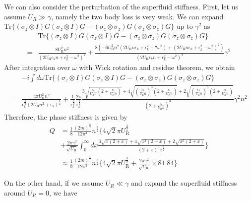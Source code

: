 \documentclass[aps,onecolumn,superscriptaddress,notitlepage,longbibliography]{revtex4-1}
\begin{document}
We can also consider the perturbation of the superfluid stiffness. First, let us assume $U_R\gg\gamma$, namely the two body loss is very weak. We can expand $\mathrm{Tr}\{(\sigma_{z}\otimes I)G(\sigma_{z}\otimes I)G-(\sigma_{z}\otimes\sigma_{z})G(\sigma_{z}\otimes\sigma_{z})G\}$
up to $\gamma^{2}$ as
\begin{align}
 & \mathrm{Tr}\{(\sigma_{z}\otimes I)G(\sigma_{z}\otimes I)G-(\sigma_{z}\otimes\sigma_{z})G(\sigma_{z}\otimes\sigma_{z})G\}\nonumber \\
= & \frac{8U_{\mathrm{R}}^{2}n^{2}}{(2U_{\mathrm{R}}\epsilon_{k}n+\epsilon_{k}^{2}-\omega^{2})^{2}}+\frac{8(-6U_{\mathrm{R}}^{2}n^{2}(2U_{\mathrm{R}}n\epsilon_{k}+\epsilon_{k}^{2}+7\omega^{2})+(2U_{\mathrm{R}}n\epsilon_{k}+\epsilon_{k}^{2}-\omega^{2})^{2})}{(2U_{\mathrm{R}}\epsilon_{k}n+\epsilon_{k}^{2}-\omega^{2})^{4}}\gamma^{2}
\end{align}
After integration over $\omega$ with Wick rotation and residue theorem, we obtain
\begin{align}
 & -i\int d\omega\mathrm{Tr}\{(\sigma_{z}\otimes I)G(\sigma_{z}\otimes I)G-(\sigma_{z}\otimes\sigma_{z})G(\sigma_{z}\otimes\sigma_{z})G\}\nonumber \\
= & \frac{4\pi U_{\mathrm{R}}^{2}n^{2}}{\epsilon_{k}^{\frac{3}{2}}(2U_{\mathrm{R}}n^{2}+\epsilon_{k})^{\frac{3}{2}}}+\frac{1}{\epsilon_{k}^{\frac{3}{2}}}\frac{2\pi}{\epsilon_{k}^{\frac{3}{2}}}\frac{3\sqrt{\frac{\epsilon_{k}}{U_{\mathrm{R}}n}(2+\frac{\epsilon_{k}}{U_{\mathrm{R}}n})}+4\sqrt{(\frac{\epsilon_{k}}{U_{\mathrm{R}}n})^{3}(2+\frac{\epsilon_{k}}{U_{\mathrm{R}}n})}+2\sqrt{(\frac{\epsilon_{k}}{U_{\mathrm{R}}n})^{5}(2+\frac{\epsilon_{k}}{U_{\mathrm{R}}n})}}{(2+\frac{\epsilon_{k}}{U_{\mathrm{R}}n})^{3}}\gamma^{2}n^{2}
\end{align}
Therefore, the phase stiffness is given by
\begin{align}
Q & =\frac{1}{8}\frac{(2m)^{\frac{5}{2}}}{12\pi^{3}}n^{\frac{3}{2}}\{4\sqrt{2}\pi U_{\mathrm{R}}^{\frac{3}{2}}\nonumber \\
 & +\frac{2\pi\gamma^{2}}{\sqrt{U_{\mathrm{R}}}}\int_{0}^{\infty}dx\frac{3\sqrt{x(2+x)}+4\sqrt{x^{3}(2+x)}+2\sqrt{x^{5}(2+x)}}{(2+x)^{3}x^{\frac{3}{2}}}\}\\
 & \approx\frac{1}{8}\frac{(2m)^{\frac{5}{2}}}{12\pi^{3}}n^{\frac{3}{2}}\{4\sqrt{2}\pi U_{\mathrm{R}}^{\frac{3}{2}}+\frac{2\pi\gamma^{2}}{\sqrt{U_{\mathrm{R}}}}\times81.84\}
\end{align}

On the other hand, if we assume $U_{R}\ll\gamma$ and expand the superfluid
stiffness around $U_{R}=0$, we have
\end{document}
